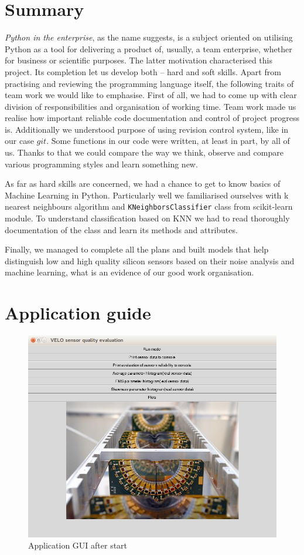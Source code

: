 \documentclass[a4paper,10pt]{article}
\begin{document}
\section{Summary}
\textit{Python in the enterprise}, as the name suggests, is a subject oriented on utilising Python as a tool for delivering a product of, usually, a team enterprise, whether for business or scientific purposes. The latter motivation characterised this project. Its completion let us develop both --  hard and soft skills. Apart from practising and reviewing the programming language itself, the following traits of team work we would like to emphasise.
First of all, we had to come up with clear division of responsibilities and organisation of working time. Team work made us realise how important reliable code documentation and control of project progress is.
Additionally we understood purpose of using revision control system, like in our case $git$. Some functions in our code were written, at least in part,
by all of us. Thanks to that we could compare the way we think, observe and compare various programming styles and learn something new.

As far as hard skills are concerned, we had a chance to get to know basics of Machine Learning in Python. Particularly well we familiarised ourselves with k nearest neighbours algorithm
and \texttt{KNeighborsClassifier} class from scikit-learn module. To understand classification based on KNN we had to read thoroughly documentation of the class
and learn its methods and attributes.


Finally, we managed to complete all the plans and built models that help distinguish low and high quality silicon sensors based on their noise analysis and machine learning, what is an evidence of our good work organisation.


\appendix
\section{Application guide}

\begin{figure}[H] \centering
    \includegraphics[width=.8\textwidth]{../fig/app_shots/start}
    \caption{Application GUI after start}
\end{figure}
\end{document}
